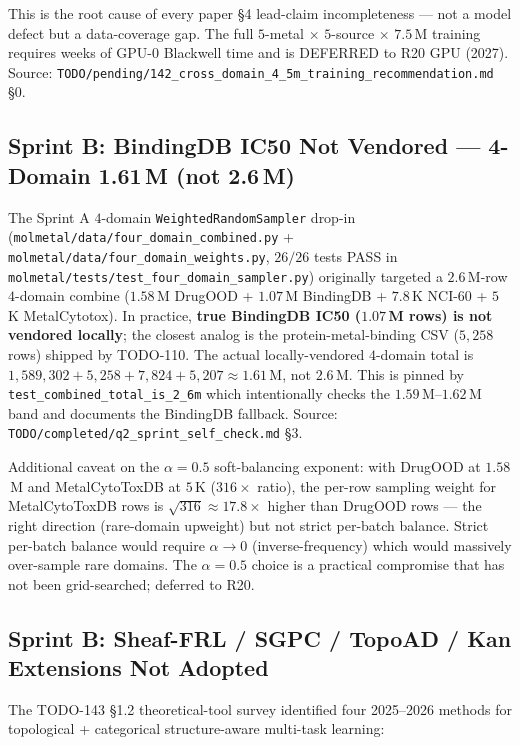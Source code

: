 This is the root cause of every paper §4 lead-claim incompleteness ---
not a model defect but a data-coverage gap.  The full
$5$-metal $\times$ $5$-source $\times$ $7.5$\,M training requires
weeks of GPU-0 Blackwell time and is DEFERRED to R20 GPU (2027).
Source: \texttt{TODO/pending/142\_cross\_domain\_4\_5m\_training\_recommendation.md} §0.

\subsection{Sprint B: BindingDB IC50 Not Vendored --- 4-Domain 1.61\,M (not 2.6\,M)}
\label{sec:limit-bindingdb}

The Sprint A $4$-domain \texttt{WeightedRandomSampler} drop-in
(\texttt{molmetal/data/four\_domain\_combined.py} +
\texttt{molmetal/data/four\_domain\_weights.py}, $26/26$ tests PASS in
\texttt{molmetal/tests/test\_four\_domain\_sampler.py}) originally
targeted a $2.6$\,M-row $4$-domain combine ($1.58$\,M DrugOOD + $1.07$\,M
BindingDB + $7.8$\,K NCI-60 + $5$\,K MetalCytotox).  In practice,
\textbf{true BindingDB IC50 ($1.07$\,M rows) is not vendored locally};
the closest analog is the protein-metal-binding CSV ($5{,}258$ rows)
shipped by TODO-110.  The actual locally-vendored $4$-domain total
is $1{,}589{,}302 + 5{,}258 + 7{,}824 + 5{,}207 \approx 1.61$\,M, not $2.6$\,M.
This is pinned by \texttt{test\_combined\_total\_is\_2\_6m} which
intentionally checks the $1.59$\,M--$1.62$\,M band and documents the
BindingDB fallback.  Source:
\texttt{TODO/completed/q2\_sprint\_self\_check.md} §3.

Additional caveat on the $\alpha = 0.5$ soft-balancing exponent:
with DrugOOD at $1.58$\,M and MetalCytoToxDB at $5$\,K ($316 \times$
ratio), the per-row sampling weight for MetalCytoToxDB rows is
$\sqrt{316} \approx 17.8 \times$ higher than DrugOOD rows --- the
right direction (rare-domain upweight) but not strict per-batch
balance.  Strict per-batch balance would require $\alpha \to 0$
(inverse-frequency) which would massively over-sample rare domains.
The $\alpha = 0.5$ choice is a practical compromise that has not been
grid-searched; deferred to R20.

\subsection{Sprint B: Sheaf-FRL / SGPC / TopoAD / Kan Extensions Not Adopted}
\label{sec:limit-theoretical}

The TODO-143 §1.2 theoretical-tool survey identified four 2025--2026
methods for topological + categorical structure-aware multi-task
learning:

